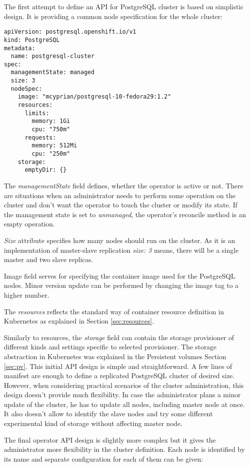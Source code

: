 \documentclass[
  digital, %
  twoside, %
  table,   %
  nolof,   %
  nolot,   %
]{fithesis3}
\begin{document}
The first attempt to define an API for PostgreSQL cluster is based on simplistic design. It is providing a common node specification for the whole cluster:

\begin{lstlisting}
apiVersion: postgresql.openshift.io/v1
kind: PostgreSQL
metadata:
  name: postgresql-cluster
spec:
  managementState: managed
  size: 3
  nodeSpec:
    image: "mcyprian/postgresql-10-fedora29:1.2"
    resources:
      limits:
        memory: 1Gi
        cpu: "750m"
      requests:
        memory: 512Mi
        cpu: "250m"
    storage:
      emptyDir: {}
\end{lstlisting}

The \textit{managementState} field defines, whether the operator is active or not. There are situations when an administrator needs to perform some operation on the cluster and don't want the operator to touch the cluster or modify its state. If the management state is set to \textit{unmanaged}, the operator’s reconcile method is an empty operation.

\textit{Size} attribute specifies how many nodes should run on the cluster. As it is an implementation of master-slave replication \textit{size: 3} means, there will be a single master and two slave replicas.

Image field serves for specifying the container image used for the PostgreSQL nodes. Minor version update can be performed by changing the image tag to a higher number.

The \textit{resources} reflects the standard way of container resource definition in Kubernetes as explained in Section \ref{sec:resources}.

Similarly to resources, the \textit{storage} field can contain the storage provisioner of different kinds and settings specific to selected provisioner. The storage abstraction in Kubernetes was explained in the Persistent volumes Section \ref{sec:pv}.
This initial API design is simple and straightforward. A few lines of manifest are enough to define a replicated PostgreSQL cluster of desired size. However, when considering practical scenarios of the cluster administration, this design doesn't provide much flexibility. In case the administrator plans a minor update of the cluster, he has to update all  nodes, including master node at once. It also doesn't allow to identify the slave nodes and try some different experimental kind of storage without affecting master node.

The final operator API design is slightly more complex but it gives the administrator more flexibility in the cluster definition. Each node is identified by its name and separate configuration for each of them can be given:
\end{document}
